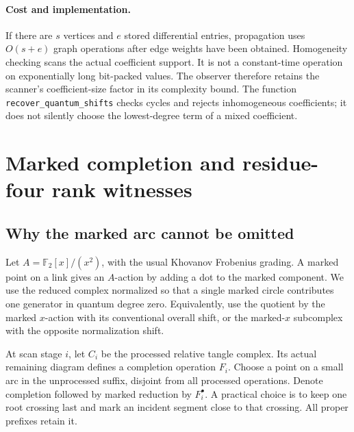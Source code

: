 \documentclass[11pt]{article}
\theoremstyle{definition}
\theoremstyle{remark}
\newcommand{\F}{{\mathbb F_2}}
\newcommand{\code}[1]{\texttt{#1}}
\begin{document}
\paragraph{Cost and implementation.}
If there are $s$ vertices and $e$ stored differential entries, propagation
uses $O(s+e)$ graph operations after edge weights have been obtained.
Homogeneity checking scans the actual coefficient support. It is not a
constant-time operation on exponentially long bit-packed values. The
observer therefore retains the scanner's coefficient-size factor in its
complexity bound. The function \code{recover\_quantum\_shifts} checks cycles
and rejects inhomogeneous coefficients; it does not silently choose the
lowest-degree term of a mixed coefficient.

\section{Marked completion and residue-four rank witnesses}
\label{sec:marked}

\subsection{Why the marked arc cannot be omitted}
Let $A=\F[x]/(x^2)$, with the usual Khovanov Frobenius grading. A marked point
on a link gives an $A$-action by adding a dot to the marked component. We use
the reduced complex normalized so that a single marked circle contributes
one generator in quantum degree zero. Equivalently, use the quotient by the
marked $x$-action with its conventional overall shift, or the marked-$x$
subcomplex with the opposite normalization shift.

At scan stage $i$, let $C_i$ be the processed relative tangle complex. Its
actual remaining diagram defines a completion operation $F_i$. Choose a
point on a small arc in the unprocessed suffix, disjoint from all processed
operations. Denote completion followed by marked reduction by
$F_i^\bullet$. A practical choice is to keep one root crossing last and mark
an incident segment close to that crossing. All proper prefixes retain it.
\end{document}
